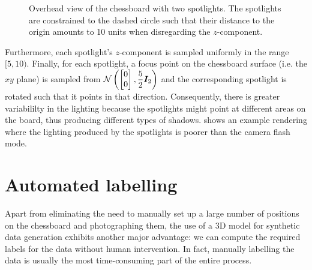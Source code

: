 \documentclass[../main.tex]{subfiles}
\begin{document}
\begin{enumerate}
\begin{figure}
            \caption[Overhead view of the chessboard with two spotlights.]{Overhead view of the chessboard with two spotlights. The spotlights are constrained to the dashed circle such that their distance to the origin amounts to 10 units when disregarding the $z$-component.}
            \label{fig:chessboard_lighting_circle}
        \end{figure}
        Furthermore, each spotlight's $z$-component is sampled uniformly in the range $[5, 10)$.
        Finally, for each spotlight, a focus point on the chessboard surface (i.e. the $xy$ plane) is sampled from
        \(
            \mathcal{N}\left(
                \begin{bmatrix}
                    0 \\ 0
                \end{bmatrix},
                \displaystyle \frac{5}{2} {\bm{I}}_2
            \right)
        \)
        and the corresponding spotlight is rotated such that it points in that direction.
        Consequently, there is greater variabililty in the lighting because the spotlights might point at different areas on the board, thus producing different types of shadows.
         shows an example rendering where the lighting produced by the spotlights is poorer than the camera flash mode.
\end{enumerate}

\section{Automated labelling}
\label{sec:automated_labelling}
Apart from eliminating the need to manually set up a large number of positions on the chessboard and photographing them, the use of a 3D model for synthetic data generation exhibits another major advantage: we can compute the required labels for the data without human intervention.
In fact, manually labelling the data is usually the most time-consuming part of the entire process.
\end{document}
